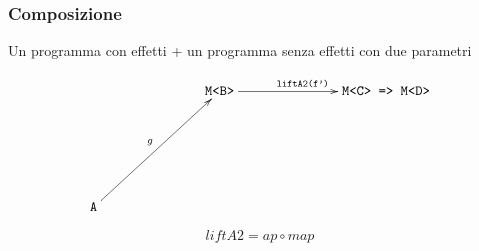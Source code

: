 \documentclass{beamer}
\begin{document}
\begin{frame}
\frametitle{Composizione}

Un programma con effetti + un programma senza effetti con due parametri

\[
\xymatrixrowsep{2.5cm}
\xymatrixcolsep{2.5cm}
\xymatrix{
  & \texttt{M<B>} \ar[r]^{\texttt{liftA2(f')}} & \texttt{M<C> => M<D>} \\
  \texttt{A} \ar[ur]^{g}
}
\]

$$
liftA2 = ap \circ map
$$

\end{frame}
\end{document}
